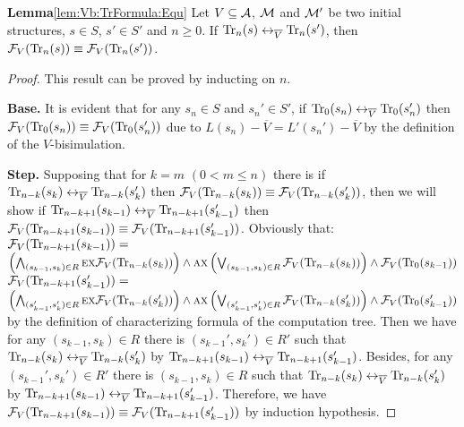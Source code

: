 \documentclass{article}
\begin{document}
\noindent \textbf{Lemma}\ref{lem:Vb:TrFormula:Equ} Let $V\subseteq {\cal A}$, ${\cal M}$ and ${\cal M}'$ be two initial structures,
 $s\in S$, $s'\in S'$ and $n\ge 0$. If $\textrm{Tr}_n(s) \leftrightarrow_{\overline V} \textrm{Tr}_n(s')$, then ${\cal F}_V(\textrm{Tr}_n(s)) \equiv {\cal F}_V(\textrm{Tr}_n(s'))$.\\
 \begin{proof}
 This result can be proved by inducting on $n$.

 \textbf{Base.} It is evident that for any $s_n\in S$ and $s_n' \in S'$, if $\textrm{Tr}_0(s_n) \leftrightarrow_{\overline V} \textrm{Tr}_0(s_n')$ then ${\cal F}_V(\textrm{Tr}_0(s_n)) \equiv {\cal F}_V(\textrm{Tr}_0(s_n'))$ due to $L(s_n) - \overline V = L'(s_n') - \overline V$ by the definition of the $V$-bisimulation.

 \textbf{Step.} Supposing that for $k=m$ $(0< m \leq n)$ there is if $\textrm{Tr}_{n-k}(s_k) \leftrightarrow_{\overline V} \textrm{Tr}_{n-k}(s_k')$ then ${\cal F}_V(\textrm{Tr}_{n-k}(s_k)) \equiv {\cal F}_V(\textrm{Tr}_{n-k}(s_k'))$, then we will show if $\textrm{Tr}_{n-k+1}(s_{k-1}) \leftrightarrow_{\overline V} \textrm{Tr}_{n-k+1}(s_{k-1}')$ then ${\cal F}_V(\textrm{Tr}_{n-k+1}(s_{k-1})) \equiv {\cal F}_V(\textrm{Tr}_{n-k+1}(s_{k-1}'))$. Obviously that:\\
  ${\cal F}_V(\textrm{Tr}_{n-k+1}(s_{k-1})) =$
  $\left(\bigwedge_{(s_{k-1},s_k)\in R}
     \textsc{e} \textsc{x} {\cal F}_V(\textrm{Tr}_{n-k}(s_k))\right)
     \wedge \textsc{a} \textsc{x}\left(\bigvee_{(s_{k-1},s_k)\in R}
     {\cal F}_V(\textrm{Tr}_{n-k}(s_k) )\right)
     \wedge {\cal F}_V(\textrm{Tr}_0(s_{k-1}))$\\
  ${\cal F}_V(\textrm{Tr}_{n-k+1}(s_{k-1}')) =$
  $\left(\bigwedge_{(s_{k-1}',s_k')\in R}
     \textsc{e} \textsc{x} {\cal F}_V(\textrm{Tr}_{n-k}(s_k'))\right)
     \wedge \textsc{a} \textsc{x}\left(\bigvee_{(s_{k-1}',s_k')\in R}
     {\cal F}_V(\textrm{Tr}_{n-k}(s_k') )\right)
     \wedge {\cal F}_V(\textrm{Tr}_0(s_{k-1}'))$ by the definition of characterizing formula of the computation tree.
  Then we have for any $(s_{k-1}, s_k) \in R$ there is $(s_{k-1}', s_k') \in R'$ such that $\textrm{Tr}_{n-k}(s_k) \leftrightarrow_{\overline V} \textrm{Tr}_{n-k}(s_k')$ by $\textrm{Tr}_{n-k+1}(s_{k-1}) \leftrightarrow_{\overline V} \textrm{Tr}_{n-k+1}(s_{k-1}')$. Besides, for any $(s_{k-1}', s_k') \in R'$ there is $(s_{k-1}, s_k) \in R$ such that $\textrm{Tr}_{n-k}(s_k) \leftrightarrow_{\overline V} \textrm{Tr}_{n-k}(s_k')$ by $\textrm{Tr}_{n-k+1}(s_{k-1}) \leftrightarrow_{\overline V} \textrm{Tr}_{n-k+1}(s_{k-1}')$.
  Therefore, we have ${\cal F}_V(\textrm{Tr}_{n-k+1}(s_{k-1})) \equiv {\cal F}_V(\textrm{Tr}_{n-k+1}(s_{k-1}'))$ by induction hypothesis.
 \end{proof}
\end{document}
